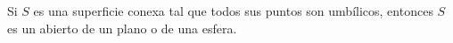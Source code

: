 %
%
%


\begin{theorem}
	\label{thm:umbilico}
	Si $S$ es una superficie conexa tal que todos sus puntos son umbílicos,
	entonces $S$ es un abierto de un plano o de una esfera.
\end{theorem}

